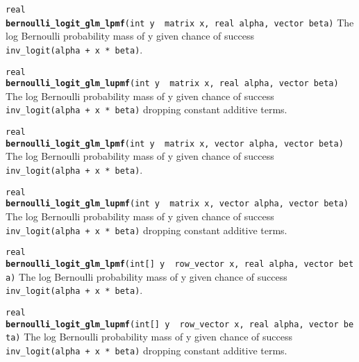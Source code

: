 \documentclass[
  10pt,
]{book}
\begin{document}
\texttt{real} \textbf{\texttt{bernoulli\_logit\_glm\_lpmf}}\texttt{(int\ y\ \textbar{}\ matrix\ x,\ real\ alpha,\ vector\ beta)}\newline
The log Bernoulli probability mass of y given chance of success
\texttt{inv\_logit(alpha\ +\ x\ *\ beta)}.


\texttt{real} \textbf{\texttt{bernoulli\_logit\_glm\_lupmf}}\texttt{(int\ y\ \textbar{}\ matrix\ x,\ real\ alpha,\ vector\ beta)}\newline
The log Bernoulli probability mass of y given chance of success
\texttt{inv\_logit(alpha\ +\ x\ *\ beta)} dropping constant additive terms.


\texttt{real} \textbf{\texttt{bernoulli\_logit\_glm\_lpmf}}\texttt{(int\ y\ \textbar{}\ matrix\ x,\ vector\ alpha,\ vector\ beta)}\newline
The log Bernoulli probability mass of y given chance of success
\texttt{inv\_logit(alpha\ +\ x\ *\ beta)}.


\texttt{real} \textbf{\texttt{bernoulli\_logit\_glm\_lupmf}}\texttt{(int\ y\ \textbar{}\ matrix\ x,\ vector\ alpha,\ vector\ beta)}\newline
The log Bernoulli probability mass of y given chance of success
\texttt{inv\_logit(alpha\ +\ x\ *\ beta)} dropping constant additive terms.


\texttt{real} \textbf{\texttt{bernoulli\_logit\_glm\_lpmf}}\texttt{(int{[}{]}\ y\ \textbar{}\ row\_vector\ x,\ real\ alpha,\ vector\ beta)}\newline
The log Bernoulli probability mass of y given chance of success
\texttt{inv\_logit(alpha\ +\ x\ *\ beta)}.


\texttt{real} \textbf{\texttt{bernoulli\_logit\_glm\_lupmf}}\texttt{(int{[}{]}\ y\ \textbar{}\ row\_vector\ x,\ real\ alpha,\ vector\ beta)}\newline
The log Bernoulli probability mass of y given chance of success
\texttt{inv\_logit(alpha\ +\ x\ *\ beta)} dropping constant additive terms.
\end{document}
